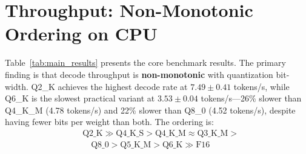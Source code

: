 \documentclass[conference]{IEEEtran}
\begin{document}
\section{Throughput: Non-Monotonic Ordering on CPU}
\label{sec:throughput}

Table~\ref{tab:main_results} presents the core benchmark results. The primary
finding is that decode throughput is \textbf{non-monotonic} with quantization
bit-width. Q2\_K achieves the highest decode rate at $7.49 \pm 0.41$ tokens/s,
while Q6\_K is the slowest practical variant at $3.53 \pm 0.04$ tokens/s---26\%
slower than Q4\_K\_M (4.78 tokens/s) and 22\% slower than Q8\_0 (4.52 tokens/s),
despite having fewer bits per weight than both. The ordering is:
{\footnotesize%
\begin{align*}
  &\text{Q2\_K} \gg \text{Q4\_K\_S} > \text{Q4\_K\_M} \approx \text{Q3\_K\_M} > \\
  &\quad \text{Q8\_0} > \text{Q5\_K\_M} > \text{Q6\_K} \gg \text{F16}
\end{align*}}
\end{document}
